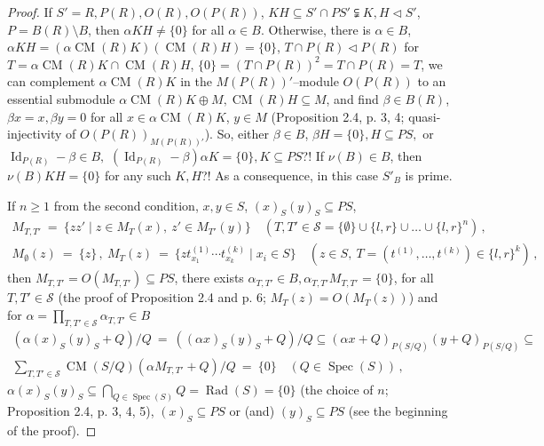 \documentclass[a4paper,11pt]{article}
\DeclareMathOperator{\prr}{Rad}
\DeclareMathOperator{\Spec}{Spec}
\DeclareMathOperator{\Id}{Id}
\DeclareMathOperator{\CM}{CM}
\begin{document}
\begin{proof}
If ${S'=R, P(R), O(R), O(P(R))}$, ${K H\subseteq S'\cap P S'
\subsetneqq K, H\lhd S'}$, ${P=B(R)\setminus B}$, then 
${\alpha K H\ne \{0\}}$ for all ${\alpha\in B}$. Otherwise, there is 
${\alpha\in B}$, ${\alpha K H=(\alpha \CM(R) K) (\CM(R) H)=\{0\}}$,  
${T\cap P(R)\lhd P(R)}$ for ${T=\alpha \CM(R) K\cap \CM(R) H}$, 
${\{0\}=(T\cap P(R))^2=T\cap P(R)=T}$, we can complement 
$\alpha \CM(R) K$ in the $M(P(R))'$--module $O(P(R))$ to an essential 
submodule ${\alpha \CM(R) K\oplus M, \CM(R) H\subseteq M}$, and find 
${\beta\in B(R)}$, ${\beta x=x, \beta y=0}$ for all 
${x\in \alpha \CM(R) K}$, ${y\in M}$ 
(Proposition 2.4, p. 3, 4; quasi-injectivity of 
$O(P(R))_{M(P(R))'}$). So, either ${\beta\in B}$, ${\beta H=\{0\}, 
H\subseteq P S,}$ or ${\Id_{P(R)}-\beta\in B,}$ 
${(\Id_{P(R)}-\beta) \alpha K=\{0\}, K\subseteq P S}$?! 
If ${\nu(B)\in B}$, then ${\nu(B) K H=\{0\}}$ for any such ${K, H}$?! As a 
consequence, in this case $S'_B$ is prime. 

If ${n\geq 1}$ from the second condition, ${x, y\in S}$, 
${(x)_S (y)_S\subseteq P S}$, 
\begin{gather*}
M_{T, T'}\ =\ \{z z'\mid z\in M_T(x),\ z'\in M_{T'}(y)\}\quad 
(T, T'\in \mathcal{S}=\{\emptyset\}\cup \{l, r\}\cup\ldots \cup \{l, r\}^n)\,,
\\
M_{\emptyset}(z)\ =\ \{z\}\,,\ 
M_T(z)\ =\ \{z t^{(1)}_{x_1}\cdots t^{(k)}_{x_k}\mid x_i\in S\}\quad 
(z\in S,\ T=(t^{(1)}, \ldots, t^{(k)})\in \{l, r\}^k)\,,
\end{gather*}
then ${M_{T, T'}=O(M_{T, T'})\subseteq P S}$, there exists 
${\alpha_{T, T'}\in B, \alpha_{T, T'} M_{T, T'}=\{0\}}$, for all ${T, T'\in \mathcal{S}}$  
(the proof of Proposition 2.4 and p. 6; ${M_T(z)=O(M_T(z))}$) and for 
${\alpha=\prod\limits_{T, T'\in \mathcal{S}} \alpha_{T, T'}\in B}$
\begin{multline*}
(\alpha (x)_S (y)_S+Q)/Q\ =\ ((\alpha x)_S (y)_S+Q)/Q\subseteq 
(\alpha x+Q)_{P(S/Q)} (y+Q)_{P(S/Q)}\subseteq
\\ 
\sum_{T, T'\in \mathcal{S}} \CM(S/Q) (\alpha M_{T, T'}+Q)/Q\ =\ \{0\}
\quad (Q\in \Spec(S))\,,
\end{multline*}
${\alpha (x)_S (y)_S\subseteq \bigcap\limits_{Q\in \Spec(S)} Q=
\prr(S)=\{0\}}$ (the choice of $n$; Proposition 2.4, p. 3, 4, 5), 
$(x)_S\subseteq P S$ or (and) ${(y)_S\subseteq P S}$ (see the 
beginning of the proof). 
\end{proof}
\end{document}
